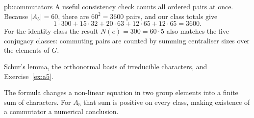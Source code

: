 \begin{solution}{pb:commutators}
A useful consistency check counts all ordered pairs at once. Because $|A_5|=60$, there are $60^2=3600$ pairs, and our class totals give
\[
1\cdot300+15\cdot32+20\cdot63+12\cdot65+12\cdot65
=\boxed{3600}.
\]
For the identity class the result $N(e)=300=60\cdot5$ also matches the five conjugacy classes: commuting pairs are counted by summing centraliser sizes over the elements of $G$.

\tools Schur's lemma, the orthonormal basis of irreducible characters, and Exercise~\ref{ex:a5}.

\leads The formula changes a non-linear equation in two group elements into a finite sum of characters. For $A_5$ that sum is positive on every class, making existence of a commutator a numerical conclusion.
\end{solution}

